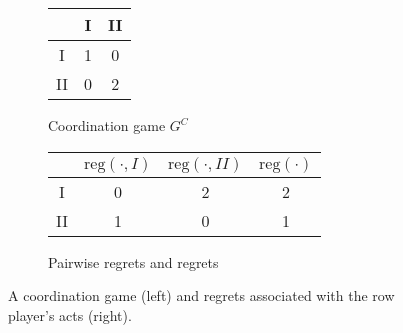 \documentclass[fleqn,reqno,11pt]{article}
\begin{document}
\begin{figure}

  \begin{subfigure}[b]{0.3\textwidth}
    \centering
    \begin{tabular}{ccc}
      \toprule
      & I & II \\
      \midrule
      I & 1 & 0 \\
      II & 0 & 2\\
      \bottomrule
    \end{tabular}
    \caption{Coordination game $G^C$}
    \label{coordgame1}
  \end{subfigure}
  \hspace{1cm}
  \begin{subfigure}[b]{0.5\textwidth}
    \centering
    \begin{tabular}{cccc}
      \toprule
      & $\text{reg}( \cdot, I)$ & $\text{reg}(\cdot, II)$ & $\text{reg}(\cdot)$ \\
      \midrule
      I  & 0 & 2 & 2 \\ 
      II & 1 & 0 & 1\\
      \bottomrule
    \end{tabular}
    \caption{Pairwise regrets and regrets}
    \label{coordgame1reg}
  \end{subfigure}
  \caption{A coordination game (left) and regrets associated with the row player's acts (right).}
    \label{coordgame1mainFig}
\end{figure}
\end{document}
